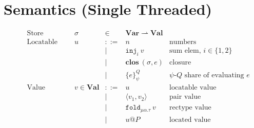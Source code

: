 \documentclass[10pt]{article}
\makeatletter
\newcommand{\kw}[1]{\ensuremath{\mathtt{#1}}}
\newcommand{\trec}[2]{\ensuremath{\mu {#1}.{#2}}}
\newcommand{\ebinop}[2]{\ensuremath{{#1}~\oplus~{#2}}}
\newcommand{\elet}[3]{\ensuremath{\kw{let}~#1\, =\, #2~\kw{in}\;{#3}}}
\newcommand{\ereveal}[4]{\ensuremath{\kw{reveal}^{#1}_{#4}~{#2}~{#3}}}
\newcommand{\econd}[3]{\ensuremath{\kw{match}~{#1}~\kw{with}~x.{#2} \diamond {#3}}}
\newcommand{\emux}[3]{\ensuremath{\kw{mux}~{#1}~\kw{?}~{#2}~\kw{:}~{#3}}}
\newcommand{\eshare}[4]{\ensuremath{\kw{share}^{#2}_{#1}~{#3}~{#4}}}
\newcommand{\einj}[2]{\ensuremath{\kw{inj}_{#1}~{#2}}}
\newcommand{\epair}[2]{\ensuremath{\langle {#1}, {#2} \rangle}}
\newcommand{\eproj}[2]{\ensuremath{\kw{\#}}_{#1}~{#2}}
\newcommand{\eapp}[2]{\ensuremath{{#1}~{#2}}}
\newcommand{\efold}[2]{\ensuremath{\kw{fold}_{#1}~{#2}}}
\newcommand{\eunfold}[1]{\ensuremath{\kw{unfold}~{#1}}}
\newcommand{\vshare}[3]{\ensuremath{\{{#3}\}^{#1}_{#2}}}
\newcommand{\vloc}[2]{\ensuremath{{#1}\kw{@}{#2}}}
\newcommand{\vclos}[2]{\ensuremath{\mathbf{clos}~({#1},{#2})}}
\newcommand{\env}{\ensuremath{\sigma}}
\makeatother
\begin{document}
\section{Semantics (Single Threaded)}

\begin{figure}
  \[\begin{array}{rlcll}
      \text{Store} & \sigma & \in & \mathbf{Var} \rightharpoonup \mathbf{Val}\\
      \text{Locatable value} & u & ::=  & n & \text{numbers} \\
                             && \mid & \einj{i}{v} & \text{sum elem, }i \in \{1,2\}\\
                             && \mid & \vclos{\env}{e}  & \text{closure} \\
                             && \mid & \vshare{Q}{\psi}{e} & \text{$\psi$-$Q$ share of evaluating $e$} \\
      \text{Value} & v  \in \mathbf{Val} & ::=  & u & \text{locatable value}\\
                       && \mid & \epair{v_1}{v_2} & \text{pair value}\\
                       && \mid & \efold{\trec{\alpha}{\tau}}{v} & \text{rectype value}\\
                       && \mid & \vloc{u}{P} & \text{located value}\\
    \end{array}
  \]


\end{figure}
\end{document}

